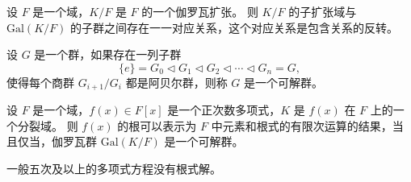 \begin{note}

\end{note}

\begin{theorem}
    设 $F$ 是一个域，$K/F$ 是 $F$ 的一个伽罗瓦扩张。
    则 $K/F$ 的子扩张域与 $\mathrm{Gal}(K/F)$ 的子群之间存在一一对应关系，这个对应关系是包含关系的反转。
    \label{thm:FundamentalTheoremOfGaloisTheory}
\end{theorem}

\begin{note}
    
\end{note}
\vspace{1em}

\begin{definition}
    设 $G$ 是一个群，如果存在一列子群
    \[
        \{e\} = G_0 \triangleleft G_1 \triangleleft G_2 \triangleleft \cdots \triangleleft G_n = G,
    \]
    使得每个商群 $G_{i+1}/G_i$ 都是阿贝尔群，则称 $G$ 是一个可解群。
    \label{def:solvable_group}
\end{definition}

\begin{theorem}
    设 $F$ 是一个域，$f(x)\in F[x]$ 是一个正次数多项式，$K$ 是 $f(x)$ 在 $F$ 上的一个分裂域。
    则 $f(x)$ 的根可以表示为 $F$ 中元素和根式的有限次运算的结果，当且仅当，伽罗瓦群 $\mathrm{Gal}(K/F)$ 是一个可解群。
    \label{thm:PolynomialEquationSolvabilityByRadicals}
\end{theorem}

\begin{theorem}
    一般五次及以上的多项式方程没有根式解。
    \label{thm:Abel_Galois_Theorem}
\end{theorem}

\newpage